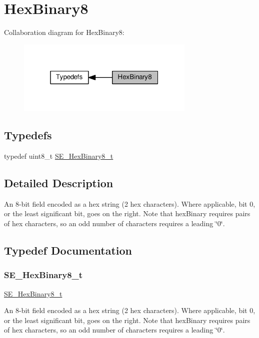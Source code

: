 \hypertarget{group__HexBinary8}{}\section{Hex\+Binary8}
\label{group__HexBinary8}
Collaboration diagram for Hex\+Binary8\+:\nopagebreak
\begin{figure}[H]
\begin{center}
\leavevmode
\includegraphics[width=241pt]{group__HexBinary8}
\end{center}
\end{figure}
\subsection*{Typedefs}
\begin{DoxyCompactItemize}
\item 
typedef uint8\+\_\+t \hyperlink{group__HexBinary8_gaecf2dab3615fb954a693c017a61f77d6}{S\+E\+\_\+\+Hex\+Binary8\+\_\+t}
\end{DoxyCompactItemize}


\subsection{Detailed Description}
An 8-\/bit field encoded as a hex string (2 hex characters). Where applicable, bit 0, or the least significant bit, goes on the right. Note that hex\+Binary requires pairs of hex characters, so an odd number of characters requires a leading \char`\"{}0\char`\"{}. 

\subsection{Typedef Documentation}
\mbox{\label{group__HexBinary8_gaecf2dab3615fb954a693c017a61f77d6}} 
\subsubsection{\texorpdfstring{S\+E\+\_\+\+Hex\+Binary8\+\_\+t}{SE\_HexBinary8\_t}}
{\footnotesize\ttfamily \hyperlink{group__HexBinary8_gaecf2dab3615fb954a693c017a61f77d6}{S\+E\+\_\+\+Hex\+Binary8\+\_\+t}}

An 8-\/bit field encoded as a hex string (2 hex characters). Where applicable, bit 0, or the least significant bit, goes on the right. Note that hex\+Binary requires pairs of hex characters, so an odd number of characters requires a leading \char`\"{}0\char`\"{}. 